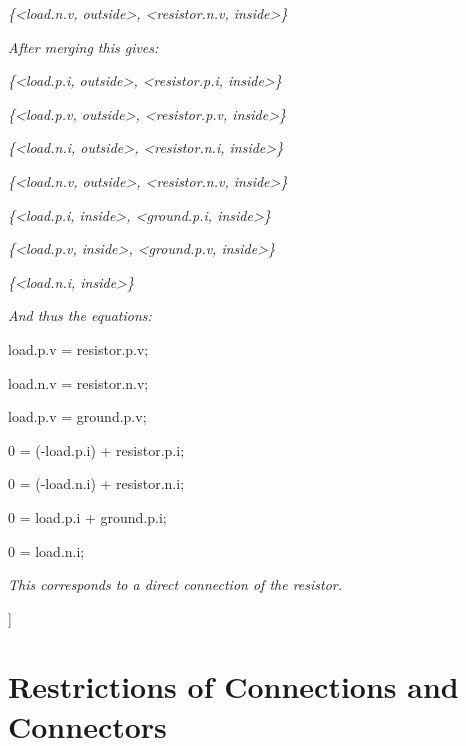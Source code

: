 \emph{\{\textless{}load.n.v, outside\textgreater{},
\textless{}resistor.n.v, inside\textgreater{}\}}

\emph{After merging this gives:}

\emph{\{\textless{}load.p.i, outside\textgreater{},
\textless{}resistor.p.i, inside\textgreater{}\}}

\emph{\{\textless{}load.p.v, outside\textgreater{},
\textless{}resistor.p.v, inside\textgreater{}\}}

\emph{\{\textless{}load.n.i, outside\textgreater{},
\textless{}resistor.n.i, inside\textgreater{}\}}

\emph{\{\textless{}load.n.v, outside\textgreater{},
\textless{}resistor.n.v, inside\textgreater{}\}}

\emph{\{\textless{}load.p.i, inside\textgreater{},
\textless{}ground.p.i, inside\textgreater{}\}}

\emph{\{\textless{}load.p.v, inside\textgreater{},
\textless{}ground.p.v, inside\textgreater{}\}}

\emph{\{\textless{}load.n.i, inside\textgreater{}\}}

\emph{And thus the equations:}

load.p.v = resistor.p.v;

load.n.v = resistor.n.v;

load.p.v = ground.p.v;

0 = (-load.p.i) + resistor.p.i;

0 = (-load.n.i) + resistor.n.i;

0 = load.p.i + ground.p.i;

0 = load.n.i;

\emph{This corresponds to a direct connection of the resistor.}

{]}

\section{Restrictions of Connections and Connectors}

